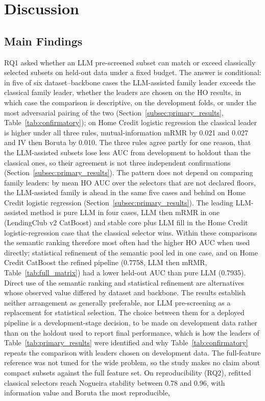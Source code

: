 \documentclass[final,5p,twocolumn]{elsarticle}
\begin{document}

\section{Discussion}
\label{sec:discussion}

\subsection{Main Findings}
\label{subsec:main_findings}

RQ1 asked whether an LLM pre-screened subset can match or exceed classically selected subsets on held-out data under a fixed budget. The answer is conditional: in five of six dataset--backbone cases the LLM-assisted family leader exceeds the classical family leader, whether the leaders are chosen on the HO results, in which case the comparison is descriptive, on the development folds, or under the most adversarial pairing of the two (Section~\ref{subsec:primary_results}, Table~\ref{tab:confirmatory}); on Home Credit logistic regression the classical leader is higher under all three rules, mutual-information mRMR by 0.021 and 0.027 and IV then Boruta by 0.010. The three rules agree partly for one reason, that the LLM-assisted subsets lose less AUC from development to holdout than the classical ones, so their agreement is not three independent confirmations (Section~\ref{subsec:primary_results}). The pattern does not depend on comparing family leaders: by mean HO AUC over the selectors that are not declared floors, the LLM-assisted family is ahead in the same five cases and behind on Home Credit logistic regression (Section~\ref{subsec:primary_results}). The leading LLM-assisted method is pure LLM in four cases, LLM then mRMR in one (LendingClub v2 CatBoost) and stable core plus LLM fill in the Home Credit logistic-regression case that the classical selector wins. Within these comparisons the semantic ranking therefore most often had the higher HO AUC when used directly; statistical refinement of the semantic pool led in one case, and on Home Credit CatBoost the refined pipeline (0.7758, LLM then mRMR, Table~\ref{tab:full_matrix}) had a lower held-out AUC than pure LLM (0.7935). Direct use of the semantic ranking and statistical refinement are alternatives whose observed value differed by dataset and backbone. The results establish neither arrangement as generally preferable, nor LLM pre-screening as a replacement for statistical selection. The choice between them for a deployed pipeline is a development-stage decision, to be made on development data rather than on the holdout used to report final performance, which is how the leaders of Table~\ref{tab:primary_results} were identified and why Table~\ref{tab:confirmatory} repeats the comparison with leaders chosen on development data. The full-feature reference was not tuned for the wide problem, so the study makes no claim about compact subsets against the full feature set. On reproducibility (RQ2), refitted classical selectors reach Nogueira stability between 0.78 and 0.96, with information value and Boruta the most reproducible, 
\end{document}
